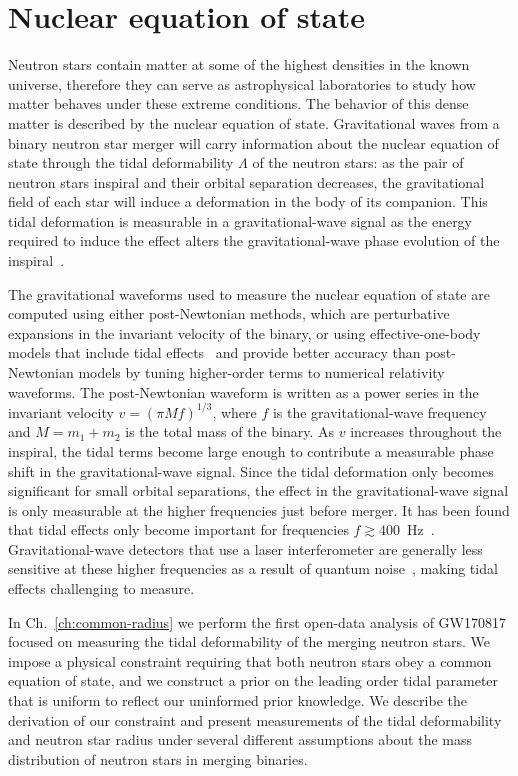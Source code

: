 \section{Nuclear equation of state}
Neutron stars contain matter at some of the highest densities in the known universe, therefore they can serve as astrophysical laboratories to study how matter behaves under these extreme conditions. The behavior of this dense matter is described by the nuclear equation of state. Gravitational waves from a binary neutron star merger will carry information about the nuclear equation of state through the tidal deformability $\Lambda$ of the neutron stars: as the pair of neutron stars inspiral and their orbital separation decreases, the gravitational field of each star will induce a deformation in the body of its companion. This tidal deformation is measurable in a gravitational-wave signal as the energy required to induce the effect alters the gravitational-wave phase evolution of the inspiral~\cite{Flanagan:2007ix}. 

The gravitational waveforms used to measure the nuclear equation of state are computed using either post-Newtonian methods, which
are perturbative expansions in the invariant velocity of the binary, or
using effective-one-body models that include tidal
effects~\cite{Damour:2009wj,Bini:2012gu,Bernuzzi:2014owa,Hotokezaka:2015xka,Nagar:2018plt,Akcay:2018yyh} 
and provide better accuracy than post-Newtonian models by tuning higher-order
terms to numerical relativity waveforms. 
The post-Newtonian waveform is written as a power series in the invariant velocity $v = (\pi M f)^{1/3}$, where $f$ is the gravitational-wave frequency and $M = m_1 + m_2$ is the total mass of the binary. As $v$ increases throughout the inspiral, the 
tidal terms become large enough to contribute a measurable phase shift in the gravitational-wave signal. Since the tidal deformation only becomes significant for small orbital separations, the effect in the gravitational-wave signal is only measurable at the higher frequencies just before merger. It has been found that tidal effects only become important for frequencies $f \gtrsim 400$~Hz~\cite{Harry:2018hke}. Gravitational-wave detectors that use a laser interferometer are generally less sensitive at these higher frequencies as a result of quantum noise~\cite{Caves:1981hw}, making tidal effects challenging to measure. 

In Ch.~\ref{ch:common-radius} we perform the first open-data analysis of GW170817 focused on measuring the tidal deformability of the merging neutron stars. We impose a physical constraint requiring that both neutron stars obey a common equation of state, and we construct a prior on the leading order tidal parameter that is uniform to reflect our uninformed prior knowledge. We describe the derivation of our constraint and present measurements of the tidal deformability and neutron star radius under several different assumptions about the mass distribution of neutron stars in merging binaries. 

